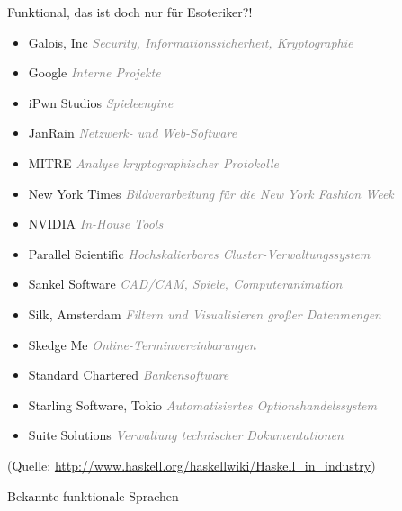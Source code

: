 \begin{frame}[fragile]{Funktional, das ist doch nur für Esoteriker?!}
\begin{itemize}
\item Galois, Inc \textcolor{gray}{\textit{Security, Informationssicherheit, Kryptographie}}
\item Google \textcolor{gray}{\textit{Interne Projekte}}
\item iPwn Studios \textcolor{gray}{\textit{Spieleengine}}
\item JanRain \textcolor{gray}{\textit{Netzwerk- und Web-Software}}
\item MITRE \textcolor{gray}{\textit{Analyse kryptographischer Protokolle}}
\item New York Times \textcolor{gray}{\textit{Bildverarbeitung für die New York Fashion Week}}
\item NVIDIA \textcolor{gray}{\textit{In-House Tools}}
\item Parallel Scientific \textcolor{gray}{\textit{Hochskalierbares Cluster-Verwaltungssystem}}
\item Sankel Software \textcolor{gray}{\textit{CAD/CAM, Spiele, Computeranimation}}
\item Silk, Amsterdam \textcolor{gray}{\textit{Filtern und Visualisieren großer Datenmengen}}
\item Skedge Me \textcolor{gray}{\textit{Online-Terminvereinbarungen}}
\item Standard Chartered \textcolor{gray}{\textit{Bankensoftware}}
\item Starling Software, Tokio \textcolor{gray}{\textit{Automatisiertes Optionshandelssystem}}
\item Suite Solutions \textcolor{gray}{\textit{Verwaltung technischer Dokumentationen}}
\end{itemize}
{\small (Quelle: \url{http://www.haskell.org/haskellwiki/Haskell_in_industry})}
\end{frame}


\begin{frame}[fragile]{Bekannte funktionale Sprachen}

\end{frame}

